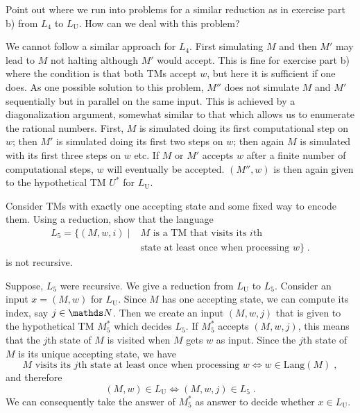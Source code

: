 \documentclass{exercise}
\begin{document}
\subtask Point out where we run into problems for a similar reduction as in exercise part
  b) from $L_4$ to $L_{\text{U}}$.  How can we deal with this problem?

  \begin{solution}
    We cannot follow a similar approach for $L_4$.  First simulating $M$ and then $M'$ may lead
    to $M$ not halting although $M'$ would accept.  This is fine for exercise part b) where the
    condition is that both TMs accept $w$, but here it is sufficient if one does.
    As one possible solution to this problem, $M''$ does not
    simulate $M$ and $M'$ sequentially but in parallel on the same input.  This is achieved
    by a diagonalization argument, somewhat similar to that which allows us to enumerate
		the rational numbers.  First, $M$ is simulated doing its first computational step on
    $w$; then $M'$ is simulated doing its first two steps on $w$; then again $M$ is simulated with
    its first three steps on $w$ etc.  If $M$ or $M'$ accepts $w$ after a finite number
    of computational steps, $w$ will eventually be accepted.  $(M'',w)$ is then again given
    to the hypothetical TM $U^*$ for $L_{\text{U}}$.
  \end{solution}


Consider TMs with exactly one accepting state and some fixed way to encode them.  Using a reduction,
show that the language
\begin{align*}
  L_5 = \{(M,w,i) \mid {}& M \text{ is a TM that visits its } i\text{th}\\
                         & \text{state at least once when processing } w \}\;.
\end{align*}
is not recursive.

\begin{solution}
  Suppose, $L_5$ were recursive.
  We give a reduction from $L_{\text{U}}$ to $L_5$.  Consider an input
  $x=(M,w)$ for $L_{\text{U}}$.  Since $M$ has one accepting state, we can compute its
  index, say $j\in\nat$.   Then we create an input $(M,w,j)$ that is given to the hypothetical
  TM $M^*_5$ which decides $L_5$.  If $M^*_5$ accepts $(M,w,j)$, this means that
  the $j$th state of $M$ is visited when $M$ gets $w$ as input.  Since the $j$th
  state of $M$ is its unique accepting state, we have
  \[ M \text{ visits its } j\text{th state at least once when processing } w \iff w\in\text{Lang}(M)\;, \]
  and therefore
	\[ (M,w)\in L_{\text{U}} \iff (M,w,j)\in L_5\;. \]
  We can consequently take the answer of $M^*_5$ as answer to decide whether $x\in L_{\text{U}}$.
\end{solution}
\end{document}
